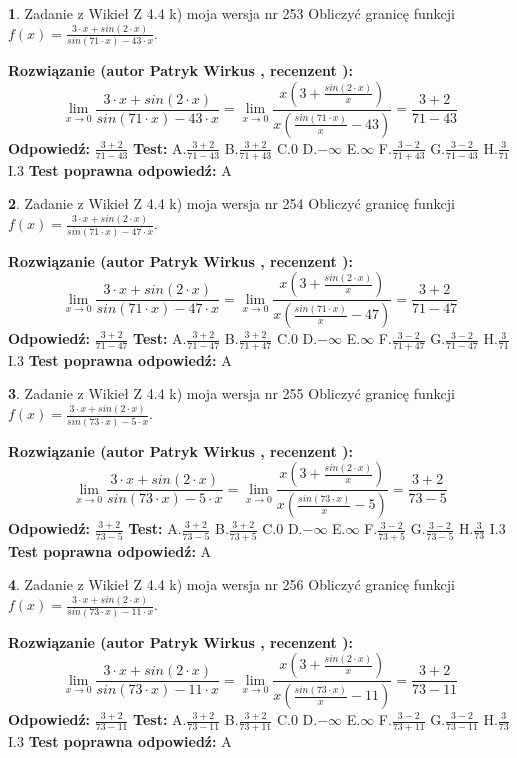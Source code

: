 \documentclass[12pt, a4paper]{article}
\theoremstyle{definition} %
\newtheorem{zad}{}
\newcommand{\zadStart}[1]{\begin{zad}#1\newline}
\newcommand{\zadStop}{\end{zad}}
\newcommand{\rozwStart}[2]{\noindent \textbf{Rozwiązanie (autor #1 , recenzent #2): }\newline}
\newcommand{\rozwStop}{\newline}
\newcommand{\odpStart}{\noindent \textbf{Odpowiedź:}\newline}
\newcommand{\odpStop}{\newline}
\newcommand{\testStart}{\noindent \textbf{Test:}\newline}
\newcommand{\testStop}{\newline}
\newcommand{\kluczStart}{\noindent \textbf{Test poprawna odpowiedź:}\newline}
\newcommand{\kluczStop}{\newline}
\begin{document}
\zadStart{Zadanie z Wikieł Z 4.4 k) moja wersja nr 253}
Obliczyć granicę funkcji $f(x)=\frac{3\cdot x +sin(2\cdot x)}{sin(71\cdot x) -43\cdot x}$.
\zadStop
\rozwStart{Patryk Wirkus}{}
$$\lim\limits_{x\to 0}\frac{3\cdot x +sin(2\cdot x)}{sin(71\cdot x) -43\cdot x}
=\lim\limits_{x\to 0}\frac{x(3+\frac{sin(2\cdot x)}{x})}{x(\frac{sin(71\cdot x)}{x}-43)}
=\frac{3+2}{71-43}$$
\rozwStop
\odpStart
$\frac{3+2}{71-43}$
\odpStop
\testStart
A.$\frac{3+2}{71-43}$
B.$\frac{3+2}{71+43}$
C.$0$
D.$-\infty$
E.$\infty$
F.$\frac{3-2}{71+43}$
G.$\frac{3-2}{71-43}$
H.$\frac{3}{71}$
I.$3$
\testStop
\kluczStart
A
\kluczStop



\zadStart{Zadanie z Wikieł Z 4.4 k) moja wersja nr 254}
Obliczyć granicę funkcji $f(x)=\frac{3\cdot x +sin(2\cdot x)}{sin(71\cdot x) -47\cdot x}$.
\zadStop
\rozwStart{Patryk Wirkus}{}
$$\lim\limits_{x\to 0}\frac{3\cdot x +sin(2\cdot x)}{sin(71\cdot x) -47\cdot x}
=\lim\limits_{x\to 0}\frac{x(3+\frac{sin(2\cdot x)}{x})}{x(\frac{sin(71\cdot x)}{x}-47)}
=\frac{3+2}{71-47}$$
\rozwStop
\odpStart
$\frac{3+2}{71-47}$
\odpStop
\testStart
A.$\frac{3+2}{71-47}$
B.$\frac{3+2}{71+47}$
C.$0$
D.$-\infty$
E.$\infty$
F.$\frac{3-2}{71+47}$
G.$\frac{3-2}{71-47}$
H.$\frac{3}{71}$
I.$3$
\testStop
\kluczStart
A
\kluczStop



\zadStart{Zadanie z Wikieł Z 4.4 k) moja wersja nr 255}
Obliczyć granicę funkcji $f(x)=\frac{3\cdot x +sin(2\cdot x)}{sin(73\cdot x) -5\cdot x}$.
\zadStop
\rozwStart{Patryk Wirkus}{}
$$\lim\limits_{x\to 0}\frac{3\cdot x +sin(2\cdot x)}{sin(73\cdot x) -5\cdot x}
=\lim\limits_{x\to 0}\frac{x(3+\frac{sin(2\cdot x)}{x})}{x(\frac{sin(73\cdot x)}{x}-5)}
=\frac{3+2}{73-5}$$
\rozwStop
\odpStart
$\frac{3+2}{73-5}$
\odpStop
\testStart
A.$\frac{3+2}{73-5}$
B.$\frac{3+2}{73+5}$
C.$0$
D.$-\infty$
E.$\infty$
F.$\frac{3-2}{73+5}$
G.$\frac{3-2}{73-5}$
H.$\frac{3}{73}$
I.$3$
\testStop
\kluczStart
A
\kluczStop



\zadStart{Zadanie z Wikieł Z 4.4 k) moja wersja nr 256}
Obliczyć granicę funkcji $f(x)=\frac{3\cdot x +sin(2\cdot x)}{sin(73\cdot x) -11\cdot x}$.
\zadStop
\rozwStart{Patryk Wirkus}{}
$$\lim\limits_{x\to 0}\frac{3\cdot x +sin(2\cdot x)}{sin(73\cdot x) -11\cdot x}
=\lim\limits_{x\to 0}\frac{x(3+\frac{sin(2\cdot x)}{x})}{x(\frac{sin(73\cdot x)}{x}-11)}
=\frac{3+2}{73-11}$$
\rozwStop
\odpStart
$\frac{3+2}{73-11}$
\odpStop
\testStart
A.$\frac{3+2}{73-11}$
B.$\frac{3+2}{73+11}$
C.$0$
D.$-\infty$
E.$\infty$
F.$\frac{3-2}{73+11}$
G.$\frac{3-2}{73-11}$
H.$\frac{3}{73}$
I.$3$
\testStop
\kluczStart
A
\kluczStop
\end{document}
